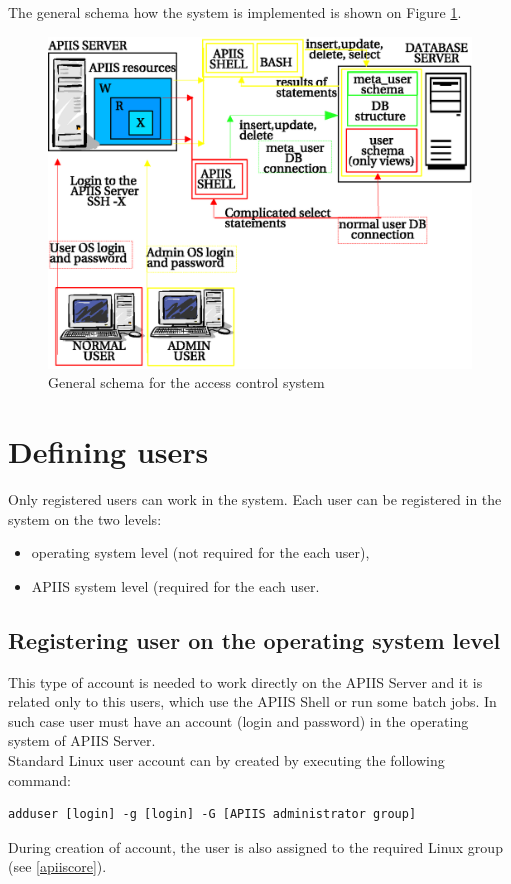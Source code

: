 The general schema how the system is implemented is shown on Figure \ref{fig:generalschema}.
\begin{figure}[h]
\begin{center}
   \includegraphics[scale=1]{./access-control/generalschema.eps}
   \caption{General schema for the access control system}
   \label{fig:generalschema}
\end{center}
\end{figure}


\section{Defining users \label{definitionofuser}}
Only registered users can work in the system. Each user can be registered in the system on the two levels: 
\begin{itemize}
\item operating system level (not required for the each user),
\item APIIS system level (required for the each user. 
\end{itemize} 
 
\subsection{Registering user on the operating system level \label{registeringuseronOSL}}
This type of account is needed to work directly on the APIIS Server and it is related only to this users, which use the APIIS Shell or run some batch jobs. In such case user must have an account (login and password) in the operating system of APIIS Server.\\
Standard Linux user account can by created by executing the following command:
\begin{verbatim}
adduser [login] -g [login] -G [APIIS administrator group] 
\end{verbatim} 
During creation of account, the user is also assigned to the required Linux group (see \ref{apiiscore}).

